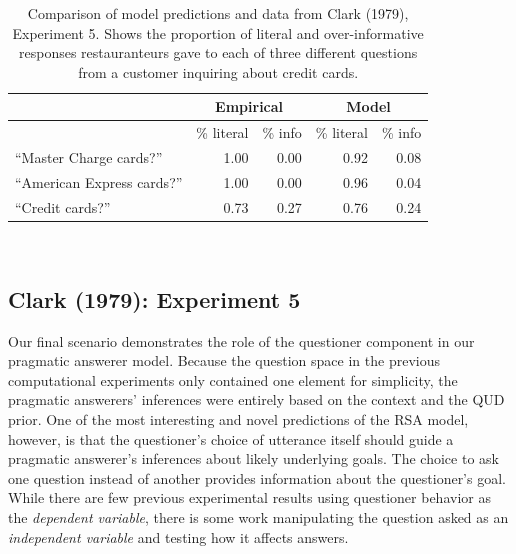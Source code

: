 \documentclass[12pt, floatsintext, jou]{apa6}
\begin{document}
\begin{table}[t!]
\centering
\begin{tabular}{ p{5cm} | r | r ||||||  r | r }
& \multicolumn{2}{c||||||}{Empirical} & \multicolumn{2}{c}{Model} \\
\hline
&           \% literal &   \%  info &           \% literal &   \%  info    \\
\hline
``Master Charge cards?'' &   1.00 & 0.00 &  0.92 & 0.08 \\
\hline
``American Express cards?''     & 1.00 & 0.00 & 0.96 & 0.04 \\
\hline
``Credit cards?''     & 0.73 & 0.27 & 0.76 & 0.24 \\
\end{tabular}
\\[1.5pt]
\caption{Comparison of model predictions and data from Clark (1979), Experiment 5. Shows the proportion of literal and over-informative responses restauranteurs gave to each of three different questions from a customer inquiring about credit cards.} 
\label{table:clark79exp5}
\end{table}

\subsection{Clark (1979): Experiment 5}
Our final scenario demonstrates the role of the questioner component in our pragmatic answerer model. Because the question space in the previous computational experiments only contained one element for simplicity, the pragmatic answerers' inferences were entirely based on the context and the QUD prior. One of the most interesting and novel predictions of the RSA model, however, is that the questioner's choice of utterance itself should guide a pragmatic answerer's inferences about likely underlying goals. The choice to ask one question instead of another provides information about the questioner's goal. While there are few previous experimental results using questioner behavior as the \emph{dependent variable}, there is some work manipulating the question asked as an \emph{independent variable} and testing how it affects answers.
\end{document}
